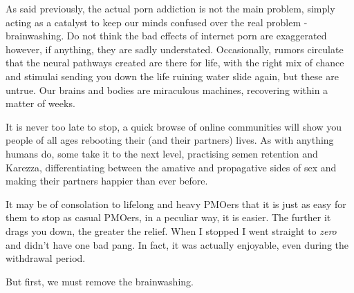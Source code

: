 \documentclass[easypeasy.tex]{subfiles}
\begin{document}
As said previously, the actual porn addiction is not the main problem, simply acting as a catalyst to keep our minds confused over the real problem - brainwashing. Do not think the bad effects of internet porn are exaggerated however, if anything, they are sadly understated. Occasionally, rumors circulate that the neural pathways created are there for life, with the right mix of chance and stimulai sending you down the life ruining water slide again, but these are untrue. Our brains and bodies are miraculous machines, recovering within a matter of weeks.

It is never too late to stop, a quick browse of online communities will show you people of all ages rebooting their (and their partners) lives. As with anything humans do, some take it to the next level, practising semen retention and Karezza, differentiating between the amative and propagative sides of sex and making their partners happier than ever before.

It may be of consolation to lifelong and heavy PMOers that it is just as easy for them to stop as casual PMOers, in a peculiar way, it is easier. The further it drags you down, the greater the relief. When I stopped I went straight to \textit{zero} and didn't have one bad pang. In fact, it was actually enjoyable, even during the withdrawal period.

But first, we must remove the brainwashing.
\end{document}
